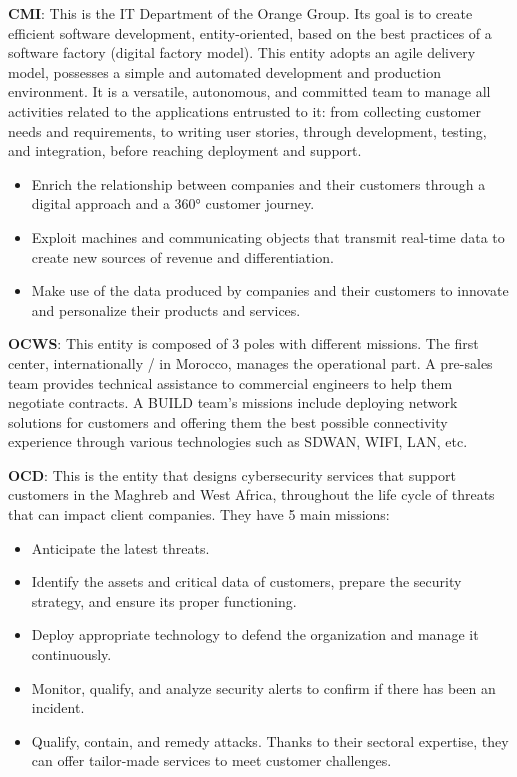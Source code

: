 \textbf{CMI}: This is the IT Department of the Orange Group. Its goal is to create efficient software development, entity-oriented, based on the best practices of a software factory (digital factory model). This entity adopts an agile delivery model, possesses a simple and automated development and production environment. It is a versatile, autonomous, and committed team to manage all activities related to the applications entrusted to it: from collecting customer needs and requirements, to writing user stories, through development, testing, and integration, before reaching deployment and support.

\begin{itemize}
  \item Enrich the relationship between companies and their customers through a digital approach and a 360° customer journey.
  \item Exploit machines and communicating objects that transmit real-time data to create new sources of revenue and differentiation.
  \item Make use of the data produced by companies and their customers to innovate and personalize their products and services.
  \end{itemize}
  
\textbf{OCWS}: This entity is composed of 3 poles with different missions. The first center, internationally / in Morocco, manages the operational part. A pre-sales team provides technical assistance to commercial engineers to help them negotiate contracts. A BUILD team's missions include deploying network solutions for customers and offering them the best possible connectivity experience through various technologies such as SDWAN, WIFI, LAN, etc.

\vspace{10pt} 

\textbf{OCD}: This is the entity that designs cybersecurity services that support customers in the Maghreb and West Africa, throughout the life cycle of threats that can impact client companies. They have 5 main missions:
  
  \begin{itemize}
  \item Anticipate the latest threats.
  \item Identify the assets and critical data of customers, prepare the security strategy, and ensure its proper functioning.
  \item Deploy appropriate technology to defend the organization and manage it continuously.
  \item Monitor, qualify, and analyze security alerts to confirm if there has been an incident.
  \item Qualify, contain, and remedy attacks. Thanks to their sectoral expertise, they can offer tailor-made services to meet customer challenges.
  \end{itemize}
  
